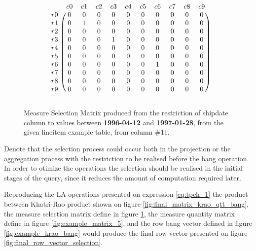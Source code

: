 \begin{figure}[H]
\centering
\caption{Measure Selection Matrix produced from the restriction of shipdate column to values between  \textbf{1996-04-12} and \textbf{1997-01-28}, from the given lineitem example table, from column \#11.}
\[
\begin{blockarray}{ccccccccccc}
		& c	0	& c	1	& c	2	& c	3	& c	4	& c	5	& c	6	& c	7	& c	8	& c	9	\\
\begin{block}{c(cccccccccc)}
r	0	&	0	&	0	&	0	&	0	&	0	&	0	&	0	&	0	&	0	&	0	\\
r	1	&	0	&	1	&	0	&	0	&	0	&	0	&	0	&	0	&	0	&	0	\\
r	2	&	0	&	0	&	0	&	0	&	0	&	0	&	0	&	0	&	0	&	0	\\
r	3	&	0	&	0	&	0	&	1	&	0	&	0	&	0	&	0	&	0	&	0	\\
r	4	&	0	&	0	&	0	&	0	&	0	&	0	&	0	&	0	&	0	&	0	\\
r	5	&	0	&	0	&	0	&	0	&	0	&	0	&	0	&	0	&	0	&	0	\\
r	6	&	0	&	0	&	0	&	0	&	0	&	0	&	1	&	0	&	0	&	0	\\
r	7	&	0	&	0	&	0	&	0	&	0	&	0	&	0	&	0	&	0	&	0	\\
r	8	&	0	&	0	&	0	&	0	&	0	&	0	&	0	&	0	&	0	&	0	\\
r	9	&	0	&	0	&	0	&	0	&	0	&	0	&	0	&	0	&	0	&	0	\\
\end{block}
\end{blockarray}
\]
\label{fig:example_restriction}
\end{figure}

Denote that the selection process could occur both in the projection or the aggregation process with the restriction to be realised before the  bang operation. In order to otimize the operations the selection should be realised in the initial stages of the query, since it reduces the amount of computation required later.\par 
 
Reproducing the LA operations presented on expression \ref{eq:tpch_1} the product between Khatri-Rao product shown on figure \ref{fig:final_matrix_krao_qtt_bang}, the measure selection matrix define in figure \ref{fig:example_restriction}, the measure quantity matrix define in figure \ref{fig:example_matrix_5}, and the row bang vector defined in figure \ref{fig:example_krao_bang} would produce the final row vector presented on figure \ref{fig:final_row_vector_selection}.

